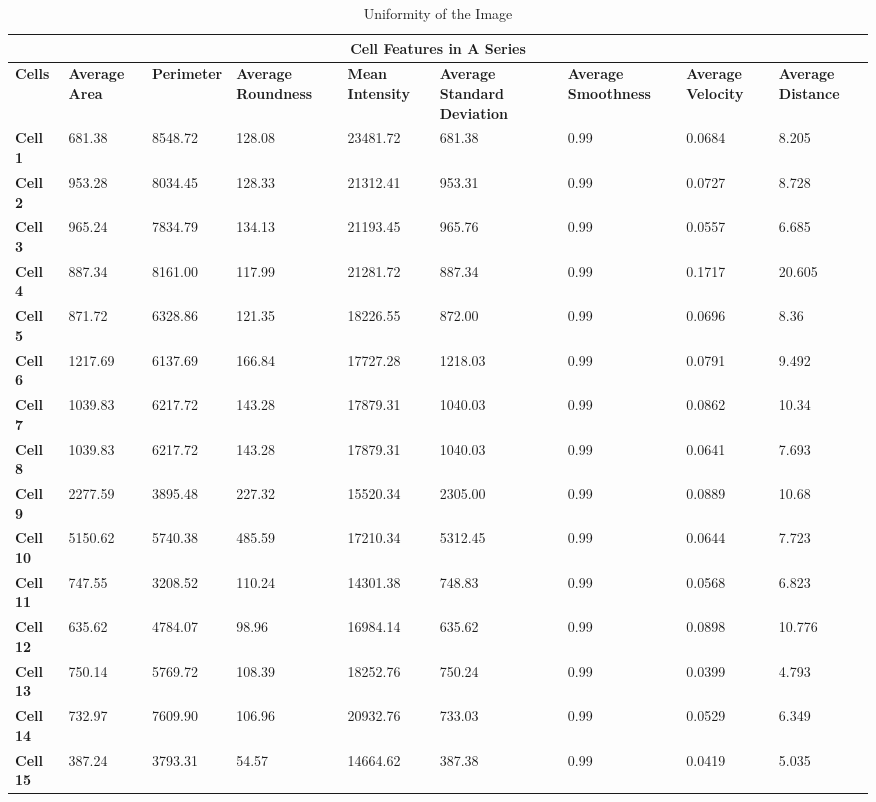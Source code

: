 \documentclass{article}
\begin{document}
\begin{table}[h!]
\centering
\caption{Uniformity of the Image}\label{table:Uniformity}
\begin{tabular}{|p{1.2cm}|p{1.5cm}|p{1.5cm}|p{1.5cm}|p{1.7cm}|p{1.5cm}|p{1.7cm}|p{1.5cm}|p{1.7cm}|}
\hline
\multicolumn{9}{|c|}{\textbf{Cell Features in A Series}} \\
\hline
\textbf{Cells} & \textbf{Average Area} & \textbf{Perimeter} & \textbf{Average Roundness} & \textbf{Mean Intensity} & \textbf{Average Standard Deviation} & \textbf{Average Smoothness} & \textbf{Average Velocity} & \textbf{Average Distance} \\
\hline
\textbf{Cell 1} & 681.38 & 8548.72 & 128.08 & 23481.72 & 681.38 & 0.99 & 0.0684 & 8.205 \\
\textbf{Cell 2} & 953.28 & 8034.45 & 128.33 & 21312.41 & 953.31 & 0.99 & 0.0727 & 8.728 \\
\textbf{Cell 3} & 965.24 & 7834.79 & 134.13 & 21193.45 & 965.76 & 0.99 & 0.0557 & 6.685 \\
\textbf{Cell 4} & 887.34 & 8161.00 & 117.99 & 21281.72 & 887.34 & 0.99 & 0.1717 & 20.605 \\
\textbf{Cell 5} & 871.72 & 6328.86 & 121.35 & 18226.55 & 872.00 & 0.99 & 0.0696 & 8.36 \\
\textbf{Cell 6} & 1217.69 & 6137.69 & 166.84 & 17727.28 & 1218.03 & 0.99 & 0.0791 & 9.492 \\
\textbf{Cell 7} & 1039.83 & 6217.72 & 143.28 & 17879.31 & 1040.03 & 0.99 & 0.0862 & 10.34 \\
\textbf{Cell 8} & 1039.83 & 6217.72 & 143.28 & 17879.31 & 1040.03 & 0.99 & 0.0641 & 7.693 \\
\textbf{Cell 9} & 2277.59 & 3895.48 & 227.32 & 15520.34 & 2305.00 & 0.99 & 0.0889 & 10.68 \\
\textbf{Cell 10} & 5150.62 & 5740.38 & 485.59 & 17210.34 & 5312.45 & 0.99 & 0.0644 & 7.723 \\
\textbf{Cell 11} & 747.55 & 3208.52 & 110.24 & 14301.38 & 748.83 & 0.99 & 0.0568 & 6.823 \\
\textbf{Cell 12} & 635.62 & 4784.07 & 98.96 & 16984.14 & 635.62 & 0.99 & 0.0898 & 10.776 \\
\textbf{Cell 13} & 750.14 & 5769.72 & 108.39 & 18252.76 & 750.24 & 0.99 & 0.0399 & 4.793 \\
\textbf{Cell 14} & 732.97 & 7609.90 & 106.96 & 20932.76 & 733.03 & 0.99 & 0.0529 & 6.349 \\
\textbf{Cell 15} & 387.24 & 3793.31 & 54.57 & 14664.62 & 387.38 & 0.99 & 0.0419 & 5.035 \\
\hline
\end{tabular}
\end{table}
\end{document}
